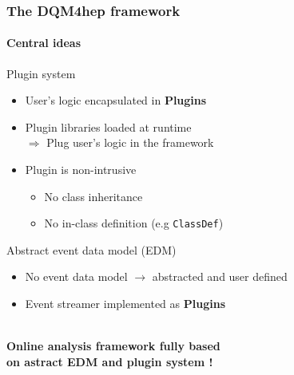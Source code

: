 \documentclass[presentation, 10pt]{beamer}
\begin{document}
\begin{frame}
  \frametitle{The DQM4hep framework}
  \framesubtitle{Central ideas}
  \footnotesize
  \begin{block}{Plugin system}
    \begin{itemize}
      \item User's logic encapsulated in \textbf{Plugins}
      \item Plugin libraries loaded at runtime \\
      {\scriptsize $\Longrightarrow$ Plug user's logic in the framework} \\
      \item Plugin is non-intrusive
      \begin{itemize}
        \scriptsize
        \item No class inheritance
        \item No in-class definition (e.g \texttt{ClassDef})
      \end{itemize}
    \end{itemize}
  \end{block}
  \begin{block}{Abstract event data model (EDM)}
    \begin{itemize}
      \item No event data model $\rightarrow$ abstracted and user defined
      \item Event streamer implemented as \textbf{Plugins}
    \end{itemize}
  \end{block}
  ~\\
  \centering \textbf{Online analysis framework fully based \\on astract EDM and plugin system !} \\
  ~\\
\end{frame}
\end{document}
